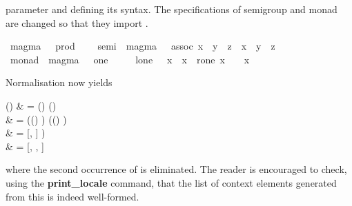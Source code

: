 \begin{isabellebody}
\begin{isamarkuptext}
  parameter and defining its syntax.  The specifications of semigroup
  and monad are changed so that they import .%
\end{isamarkuptext}%
\isamarkupfalse%
\ magma\ {\isacharequal}\ \ prod\ {\isacharparenleft}\ {\isachardoublequote}{\isasymcdot}{\isachardoublequote}\ {}{}{\isacharparenright}\isanewline
\isanewline
\isamarkupfalse%
\ semi{\isacharprime}\ {\isacharequal}\ magma\ {\isacharplus}\ \ assoc{\isacharcolon}\ {\isachardoublequote}{\isacharparenleft}x\ {\isasymcdot}\ y{\isacharparenright}\ {\isasymcdot}\ z\ {\isacharequal}\ x\ {\isasymcdot}\ {\isacharparenleft}y\ {\isasymcdot}\ z{\isacharparenright}{\isachardoublequote}\isanewline
\isamarkupfalse%
\ monad{\isacharprime}\ {\isacharequal}\ magma\ {\isacharplus}\ \ one\ {\isacharparenleft}{\isachardoublequote}{\isasymone}{\isachardoublequote}\ {}{}{}{\isacharparenright}\isanewline
\ \ \ l{\isacharunderscore}one{\isacharcolon}\ {\isachardoublequote}{\isasymone}\ {\isasymcdot}\ x\ {\isacharequal}\ x{\isachardoublequote}\ \ r{\isacharunderscore}one{\isacharcolon}\ {\isachardoublequote}x\ {\isasymcdot}\ {\isasymone}\ {\isacharequal}\ x{\isachardoublequote}\isamarkuptrue%
%
\begin{isamarkuptext}%
Normalisation now yields
\begin{align*%
}
  \N() & =
       \N() \App \N() \\
     & = (\N() ) \App
         (\N() ) \\
     & = [, ] ) \\
     & = [, ,
          ]
\end{align*%
}
  where the second occurrence of  is eliminated.
  The reader is encouraged to check, using the \textbf{print\_locale}
  command, that the list of context elements generated from this is
  indeed well-formed.


\end{isamarkuptext}
\end{isabellebody}
